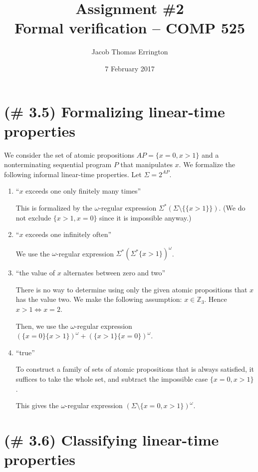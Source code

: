 \documentclass[letterpaper,11pt]{article}
\author{Jacob Thomas Errington}
\title{Assignment \#2\\Formal verification -- COMP 525}
\date{7 February 2017}
\newcommand{\Z}{\mathbb{Z}}
\begin{document}
\maketitle

\section{(\# 3.5) Formalizing linear-time properties}

We consider the set of atomic propositions $AP = \{x = 0, x > 1\}$ and a
nonterminating sequential program $P$ that manipulates $x$. We formalize the
following informal linear-time properties. Let $\Sigma = 2^{AP}$.

\begin{enumerate}
        \renewcommand{\labelenumi}{(\alph{enumi})}
        \setcounter{enumi}{4}
    \item ``$x$ exceeds one only finitely many times''

        This is formalized by the $\omega$-regular expression
        $\Sigma^* (\Sigma \setminus \{ \{x>1\} \})$.
        (We do not exclude $\{x>1, x=0\}$ since it is impossible anyway.)

    \item ``$x$ exceeds one infinitely often''

        We use the $\omega$-regular expression
        $\Sigma^* (\Sigma^* \{x>1\})^\omega$.

    \item ``the value of $x$ alternates between zero and two''

        There is no way to determine using only the given atomic propositions
        that $x$ has the value two. We make the following assumption:
        $x \in \Z_3$. Hence $x > 1 \iff x = 2$.

        Then, we use the $\omega$-regular expression
        $(\{x=0\}\{x>1\})^\omega + (\{x>1\}\{x=0\})^\omega$.

    \item ``true''

        To construct a family of sets of atomic propositions that is always
        satisfied, it suffices to take the whole set, and subtract the
        impossible case $\{x=0, x>1\}$.

        This gives the $\omega$-regular expression
        $(\Sigma \setminus \{x=0, x>1\})^\omega$.
\end{enumerate}

\section{(\# 3.6) Classifying linear-time properties}
\end{document}
